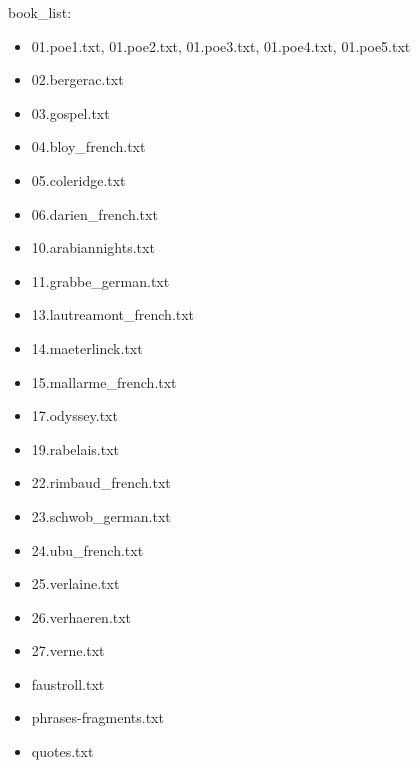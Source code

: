 book\_list:
\begin{itemize}
  \item 01.poe1.txt, 01.poe2.txt, 01.poe3.txt, 01.poe4.txt, 01.poe5.txt
  \item 02.bergerac.txt
  \item 03.gospel.txt
  \item 04.bloy\_french.txt
  \item 05.coleridge.txt
  \item 06.darien\_french.txt
  \item 10.arabiannights.txt
  \item 11.grabbe\_german.txt
  \item 13.lautreamont\_french.txt
  \item 14.maeterlinck.txt
  \item 15.mallarme\_french.txt
  \item 17.odyssey.txt
  \item 19.rabelais.txt
  \item 22.rimbaud\_french.txt
  \item 23.schwob\_german.txt
  \item 24.ubu\_french.txt
  \item 25.verlaine.txt
  \item 26.verhaeren.txt
  \item 27.verne.txt
  \item faustroll.txt
  \item phrases-fragments.txt
  \item quotes.txt
\end{itemize}

